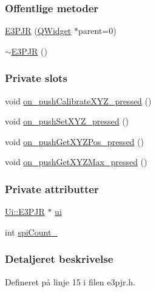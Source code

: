 \subsubsection*{Offentlige metoder}
\begin{DoxyCompactItemize}
\item 
\hyperlink{class_e3_p_j_r_a3a52bafbf77585b77f7cdfd3d5a2ab56}{E3\+P\+JR} (\hyperlink{class_q_widget}{Q\+Widget} $\ast$parent=0)
\item 
\hyperlink{class_e3_p_j_r_aeb532350a6ae56c292c37a6b983dffa2}{$\sim$\+E3\+P\+JR} ()
\end{DoxyCompactItemize}
\subsubsection*{Private slots}
\begin{DoxyCompactItemize}
\item 
void \hyperlink{class_e3_p_j_r_a6be58dfeec35962cafa418d47ebffc72}{on\+\_\+push\+Calibrate\+X\+Y\+Z\+\_\+pressed} ()
\item 
void \hyperlink{class_e3_p_j_r_af5298acfab7b21baee2e8eb8dd495ddb}{on\+\_\+push\+Set\+X\+Y\+Z\+\_\+pressed} ()
\item 
void \hyperlink{class_e3_p_j_r_a1384ab1d803de29103a58660ec602240}{on\+\_\+push\+Get\+X\+Y\+Z\+Pos\+\_\+pressed} ()
\item 
void \hyperlink{class_e3_p_j_r_a0230271a4b635131924f64f1fa354345}{on\+\_\+push\+Get\+X\+Y\+Z\+Max\+\_\+pressed} ()
\end{DoxyCompactItemize}
\subsubsection*{Private attributter}
\begin{DoxyCompactItemize}
\item 
\hyperlink{class_ui_1_1_e3_p_j_r}{Ui\+::\+E3\+P\+JR} $\ast$ \hyperlink{class_e3_p_j_r_a253979c6b115fd717a42bc24d84427c5}{ui}
\item 
int \hyperlink{class_e3_p_j_r_ab3c3e25d51904424592449e6dd0d813f}{spi\+Count\+\_\+}
\end{DoxyCompactItemize}


\subsubsection{Detaljeret beskrivelse}


Defineret på linje 15 i filen e3pjr.\+h.



